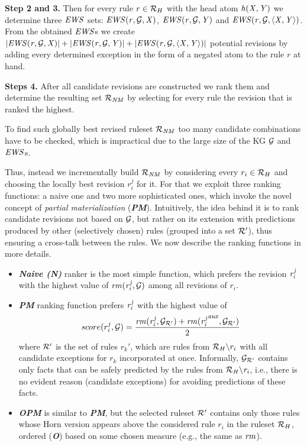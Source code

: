 \noindent \textbf{Step 2 and 3.} Then for every rule $r\in \mathcal{R}_H$ with the head atom $\mathit{h(X,Y)}$ we determine three $\mathit{EWS}$ sets: $\mathit{EWS(r,\mathcal{G},X)}$, $\mathit{EWS(r,\mathcal{G},Y)}$ and $\mathit{EWS(r,\mathcal{G},\langle X,Y\rangle)}$. From the obtained $\mathit{EWS}$s we create $|\mathit{EWS(r,\mathcal{G},X)}|+|\mathit{EWS(r,\mathcal{G},Y)}|+|\mathit{EWS(r,\mathcal{G},\langle X,Y\rangle)}|$ potential revisions by adding every determined exception in the form of a negated atom to the rule $r$ at hand.
\medskip

\noindent \textbf{Steps 4.} 
After all candidate revisions are constructed we rank them and determine the resulting set $\mathcal{R}_{\mathit{NM}}$ by selecting for every rule the revision that is ranked the highest.

To find such globally best revised ruleset $\mathcal{R}_{\mathit{NM}}$ too many candidate combinations have to be checked, which is impractical due to the large size of the KG $\mathcal{G}$ and $\mathit{EWS}$s. 

Thus, instead we incrementally build $\mathcal{R}_{\mathit{NM}}$ by considering every $r_i \in \mathcal{R}_{H}$ and choosing the locally best revision $r_i^{j}$ for it.
For that we exploit three ranking functions: a naive one and two more sophisticated ones, which invoke the novel concept of \emph{partial materialization} (\textbf{\em PM}). Intuitively, the idea behind it is to rank candidate revisions not based on $\mathcal{G}$, but rather on its extension with predictions produced by other (selectively chosen) rules (grouped into a set $\mathcal{R}'$), thus ensuring a cross-talk between the rules. We now describe the ranking functions in more details.

\begin{itemize}
\item {\textbf{\em Naive (N)}} ranker is the most simple function, which prefers the revision $\mathit{r^j_i}$ with the highest value of $\mathit{rm(r^j_{i},\mathcal{G})}$ among all revisions of $r_i$.
\smallskip

\item {\textbf{\em PM}} ranking function prefers $\mathit{r^j_i}$ with the highest value of
\begin{equation}
\label{pm}
score(r^j_i,\mathcal{G})=\dfrac{\mathit{rm(r^j_i,\mathcal{G}_{\mathcal{R}'})+rm({r^j_i}^{aux},\mathcal{G}_{\mathcal{R}'})}}{2}
\end{equation}
 where $\mathcal{R}'$ is the set of rules $r_k'$, which are rules from $\mathcal{R}_H\backslash r_i$ with all candidate exceptions for $r_k$ incorporated at once. Informally, $\mathcal{G}_{\mathcal{R}'}$ contains only facts that can be safely predicted by the rules from $\mathit{\mathcal{R}_H\backslash r_i}$, i.e., there is no evident reason (candidate exceptions) for avoiding predictions of these facts.
 \smallskip
 
\item {\textbf{\em OPM}} is similar to \textbf{{\em PM}}, but the selected ruleset $\mathcal{R}'$ contains only those rules whose Horn version appears above the considered rule $r_i$ in the ruleset $\mathcal{R}_H$, ordered (\textbf{\em O}) based on some chosen measure (e.g., the same as $\mathit{rm}$). 
\end{itemize}

